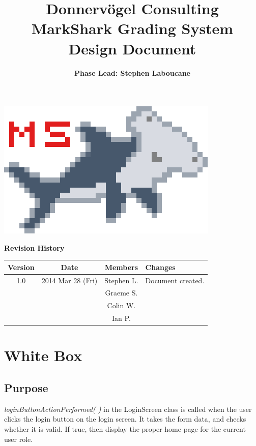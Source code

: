 \documentclass{article}
\begin{document}
\title{Donnervögel Consulting \\ MarkShark Grading System \\ Design Document}
\author{\textbf{Phase Lead: Stephen Laboucane}}
\maketitle
\centerline{\includegraphics{../images/logo/markshark-10x}}
\clearpage

\textbf{Revision History}
\begin{center}
  \begin{tabular}{| c | c | c | l |}
    \hline
    Version & Date & Members & Changes\\
    \hline
    1.0 & 2014 Mar 28 (Fri) & Stephen L. & Document created.\\
    & & Graeme S. & \\
    & & Colin W. &\\
    & & Ian P. &\\
    \hline
  \end{tabular}
\end{center}
\clearpage

\tableofcontents
\clearpage

\section{White Box} 
\subsection{Purpose}
\textit{loginButtonActionPerformed( )} in the LoginScreen class is called when the user clicks the login button on the login screen.  It takes the form data, and checks whether it is valid.  If true, then display the proper home page for the current user role.
\end{document}
